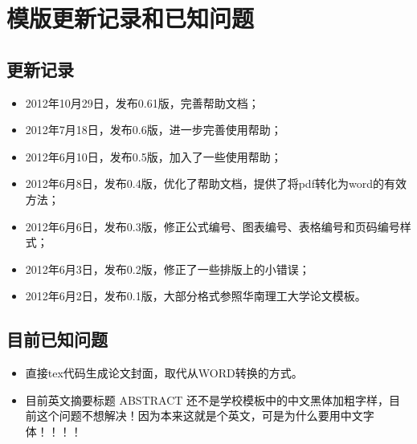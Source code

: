 \chapter{模版更新记录和已知问题}
\section{更新记录}
\begin{itemize}
\item 2012年10月29日，发布0.61版，完善帮助文档；
\item 2012年7月18日，发布0.6版，进一步完善使用帮助；
\item 2012年6月10日，发布0.5版，加入了一些使用帮助；
\item 2012年6月8日，发布0.4版，优化了帮助文档，提供了将pdf转化为word的有效方法；
\item 2012年6月6日，发布0.3版，修正公式编号、图表编号、表格编号和页码编号样式；
\item 2012年6月3日，发布0.2版，修正了一些排版上的小错误；
\item 2012年6月2日，发布0.1版，大部分格式参照华南理工大学论文模板。
\end{itemize}
\section{目前已知问题}
\begin{itemize}
\item 直接tex代码生成论文封面，取代从WORD转换的方式。
\item 目前英文摘要标题 ABSTRACT 还不是学校模板中的中文黑体加粗字样，目前这个问题不想解决！因为本来这就是个英文，可是为什么要用中文字体！！！！
\end{itemize}
